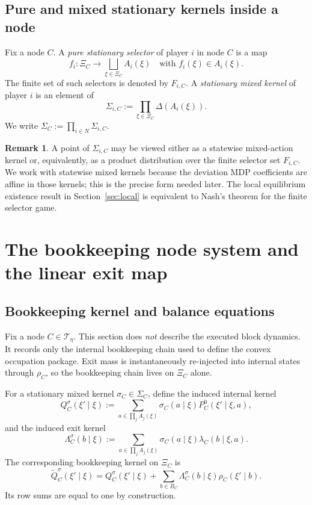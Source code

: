 \documentclass[12pt]{article}
\theoremstyle{definition}
\newtheorem{remark}[theorem]{Remark}
\newcommand{\1}{\mathbf{1}}
\newcommand{\cT}{\mathcal{T}}
\begin{document}
\subsection{Pure and mixed stationary kernels inside a node}

Fix a node $C$. A \emph{pure stationary selector} of player $i$ in node $C$ is a
map
\[
f_i: \Xi_C\to \bigsqcup_{\xi\in\Xi_C}A_i(\xi)
\quad\text{with }f_i(\xi)\in A_i(\xi).
\]
The finite set of such selectors is denoted by $F_{i,C}$. A \emph{stationary
mixed kernel} of player $i$ is an element of
\[
\Sigma_{i,C}:=\prod_{\xi\in\Xi_C}\Delta(A_i(\xi)).
\]
We write $\Sigma_C:=\prod_{i\in N}\Sigma_{i,C}$.

\begin{remark}
A point of $\Sigma_{i,C}$ may be viewed either as a statewise mixed-action kernel
or, equivalently, as a product distribution over the finite selector set
$F_{i,C}$. We work with statewise mixed kernels because the deviation MDP
coefficients are affine in those kernels; this is the precise form needed later.
The local equilibrium existence result in Section~\ref{sec:local} is equivalent to
Nash's theorem for the finite selector game.
\end{remark}

\section{The bookkeeping node system and the linear exit map}
\label{sec:bookkeeping}

\subsection{Bookkeeping kernel and balance equations}

Fix a node $C\in\cT_\eta$. This section does \emph{not} describe the executed
block dynamics. It records only the internal bookkeeping chain used to define the
convex occupation package. Exit mass is instantaneously re-injected into internal
states through $\rho_C$, so the bookkeeping chain lives on $\Xi_C$ alone.

For a stationary mixed kernel $\sigma_C\in\Sigma_C$, define the induced internal
kernel
\[
Q_C^{\sigma}(\xi'\mid \xi)
:=
\sum_{a\in\prod_j A_j(\xi)} \sigma_C(a\mid \xi)
P_C^0(\xi'\mid \xi,a),
\]
and the induced exit kernel
\[
\Lambda_C^{\sigma}(b\mid\xi)
:=
\sum_{a\in\prod_j A_j(\xi)}\sigma_C(a\mid\xi)\lambda_C(b\mid\xi,a).
\]
The corresponding bookkeeping kernel on $\Xi_C$ is
\begin{equation}
\label{eq:bookkeeping-kernel}
\widetilde Q_C^{\sigma}(\xi'\mid \xi)
=
Q_C^{\sigma}(\xi'\mid \xi)
+
\sum_{b\in B_C}\Lambda_C^{\sigma}(b\mid \xi)\rho_C(\xi'\mid b).
\end{equation}
Its row sums are equal to one by construction.
\end{document}
